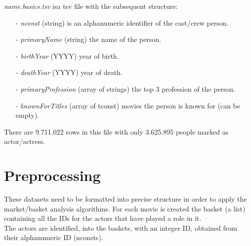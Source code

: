 \documentclass[14pt]{extarticle}
\begin{document}
\noindent
{\it name.basics.tsv} isa  tsv file with the subsequent structure:
\begin{itemize}[leftmargin=*]
\vspace{-0.4cm}\item[-]{\it nconst } (string) is an alphanumeric identifier of the cast/crew person.
\vspace{-1.1cm}\item[-]{\it primaryName } (string) the name of the person.
\vspace{-0.4cm}\item[-]{\it birthYear } (YYYY) year of birth.
\vspace{-0.4cm}\item[-]{\it deathYear  } (YYYY) year of death.
\vspace{-0.4cm}\item[-]{\it primaryProfession } (array of strings) the top 3 profession of the person.
\vspace{-1.0cm}\item[-]{\it knownForTitles  } (array of tconst) movies the person is known for (can be empty).
\end{itemize}
There are 9.711.022 rows in this file with only 3.625.895 people marked as actor/actress.
\section{Preprocessing}
These datasets need to be formatted into precise structure in order to apply the market/basket analysis algorithms. For each movie is created the basket (a list) containing all the IDs for the actors that have played a role in it. \\
The actors are identified, into the baskets, with an integer ID, obtained from their alphanumeric ID (nconsts).
\end{document}
